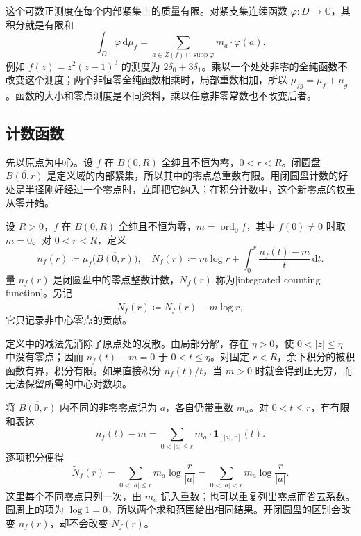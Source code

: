 这个可数正测度在每个内部紧集上的质量有限。对紧支集连续函数 \(\varphi:D\to\mathbb C\)，其积分就是有限和
\[
 \int_D\varphi\,\mathrm d\mu_f
 =\sum_{a\in Z(f)\cap\operatorname{supp}\varphi}m_a\cdot\varphi(a).
\]
例如 \(f(z)=z^2(z-1)^3\) 的测度为 \(2\delta_0+3\delta_1\)。乘以一个处处非零的全纯函数不改变这个测度；两个非恒零全纯函数相乘时，局部重数相加，所以 \(\mu_{fg}=\mu_f+\mu_g\)。函数的大小和零点测度是不同资料，乘以任意非零常数也不改变后者。

\subsection{计数函数}
\label{b3:subsec:180102}

先以原点为中心。设 \(f\) 在 \(B(0,R)\) 全纯且不恒为零，\(0<r<R\)。闭圆盘 \(\overline{B(0,r)}\) 是定义域的内部紧集，所以其中的零点总重数有限。用闭圆盘计数的好处是半径刚好经过一个零点时，立即把它纳入；在积分计数中，这个新零点的权重从零开始。

\begin{definition}[整数计数与积分计数]\label{b3:def:18-counting-functions}
设 \(R>0\)，\(f\) 在 \(B(0,R)\) 全纯且不恒为零，\(m=\operatorname{ord}_0f\)，其中 \(f(0)\ne0\) 时取 \(m=0\)。对 \(0<r<R\)，定义
\[
 n_f(r)\coloneqq\mu_f\bigl(\overline{B(0,r)}\bigr),\quad
 N_f(r)\coloneqq m\log r+\int_0^r\frac{n_f(t)-m}{t}\,\mathrm dt.
\]
量 \(n_f(r)\) 是闭圆盘中的零点整数计数，\(N_f(r)\) 称为[integrated counting function]。另记
\[
 \widetilde N_f(r)\coloneqq N_f(r)-m\log r,
\]
它只记录非中心零点的贡献。
\end{definition}

定义中的减法先消除了原点处的发散。由局部分解，存在 \(\eta>0\)，使 \(0<|z|\le\eta\) 中没有零点；因而 \(n_f(t)-m=0\) 于 \(0<t\le\eta\)。对固定 \(r<R\)，余下积分的被积函数有界，积分有限。如果直接积分 \(n_f(t)/t\)，当 \(m>0\) 时就会得到正无穷，而无法保留所需的中心对数项。

\ProseParagraphBreak

将 \(\overline{B(0,r)}\) 内不同的非零零点记为 \(a\)，各自仍带重数 \(m_a\)。对 \(0<t\le r\)，有有限和表达
\[
 n_f(t)-m
 =\sum_{0<|a|\le r}m_a\cdot\mathbf1_{[|a|,r]}(t).
\]
逐项积分便得
\begin{equation}\label{b3:eq:18-integrated-counting}
 \widetilde N_f(r)
 =\sum_{0<|a|\le r}m_a\log\frac r{|a|}
 =\sum_{0<|a|<r}m_a\log\frac r{|a|}.
\end{equation}
这里每个不同零点只列一次，由 \(m_a\) 记入重数；也可以重复列出零点而省去系数。圆周上的项为 \(\log1=0\)，所以两个求和范围给出相同结果。开闭圆盘的区别会改变 \(n_f(r)\)，却不会改变 \(N_f(r)\)。

